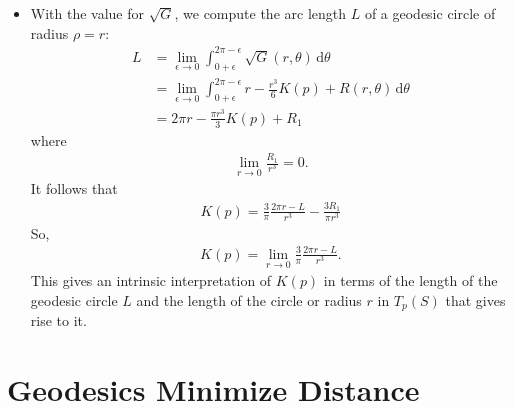 \documentclass[10pt]{article}
\newcommand{\dee}{\mathrm{d}}
\newcommand{\ra}{\rightarrow}
\begin{document}
\begin{itemize}
    \item With the value for $\sqrt{G}$, we compute the arc length $L$ of a geodesic circle of radius $\rho = r$:
    \begin{align*}
      L 
      &= \lim_{\epsilon \ra 0} \int_{0 + \epsilon}^{2\pi - \epsilon} \sqrt{G}(r, \theta)\, \dee\theta\\
      &= \lim_{\epsilon \ra 0} \int_{0 + \epsilon}^{2\pi - \epsilon} r - \frac{r^3}{6} K(p) + R(r, \theta) \, \dee\theta\\
      &= 2\pi r - \frac{\pi r^3}{3} K(p) + R_1
    \end{align*}
    where
    \begin{align*}
      \lim_{r \ra 0} \frac{R_1}{r^3} = 0.
    \end{align*}
    It follows that
    \begin{align*}
      K(p) = \frac{3}{\pi}\frac{2\pi r - L}{r^3} - \frac{3R_1}{\pi r^3}
    \end{align*}
    So,
    \begin{align*}
      K(p) = \lim_{r \ra 0} \frac{3}{\pi} \frac{2\pi r - L}{r^3}.
    \end{align*}
    This gives an intrinsic interpretation of $K(p)$ in terms of the length of the geodesic circle $L$ and the length of the circle or radius $r$ in $T_p(S)$ that gives rise to it.
  \end{itemize}

  \section{Geodesics Minimize Distance}
  
\end{document}

